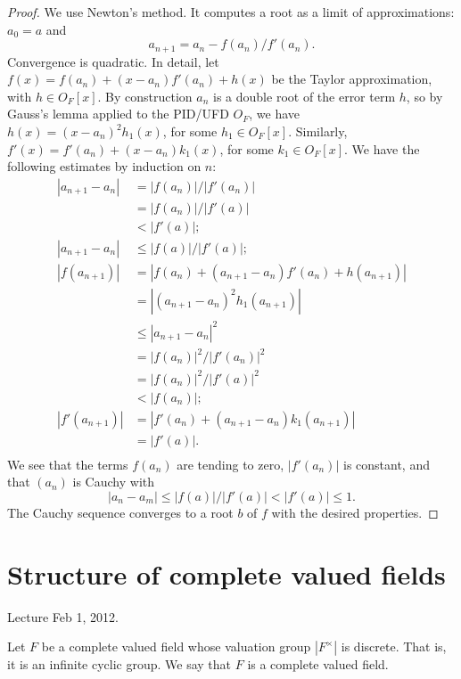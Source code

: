 \documentclass{amsart}
\def\abs#1{{|#1|}}
\begin{document}
\begin{proof} We use Newton's method.  It computes a root as a limit
of approximations:  $a_0=a$ and
\[
 a_{n+1} = a_n - f(a_n)/f'(a_n).
\]
Convergence is quadratic.  In detail, let $f(x) = f(a_n) + (x-a_n)
f'(a_n) + h(x)$ be the Taylor approximation, with $h\in O_F[x]$.  By
construction $a_n$ is a double root of the error term $h$, 
so by Gauss's lemma \cite[8.18]{knapp-basic}
applied to the PID/UFD $O_F$, we have $h(x) = (x-a_n)^2 h_1(x)$, for
some $h_1\in O_F[x]$. Similarly, $f'(x)=f'(a_n)+(x-a_n)k_1(x)$, for some $k_1\in O_F[x]$.
We have the following estimates by induction on $n$:
\begin{align*}
\abs{a_{n+1}-a_n} &= \abs{f(a_n)}/\abs{f'(a_{n})} \\
   &= \abs{f(a_n)}/\abs{f'(a)}\\
   &< \abs{f'(a)};\\
\abs{a_{n+1}-a_n} &\le \abs{f(a)}/\abs{f'(a)};\\
\abs{f(a_{n+1})} &= \abs{f(a_n) +(a_{n+1}-a_n) f'(a_n) + h(a_{n+1})}\\
 &= \abs{(a_{n+1}-a_n)^2h_1(a_{n+1})}\\
 &\le \abs{a_{n+1}-a_n}^2\\
 &= \abs{f(a_n)}^2/\abs{f'(a_{n})}^2\\
 &= \abs{f(a_n)}^2/\abs{f'(a)}^2\\
 &< \abs{f(a_n)};\\
\abs{f'(a_{n+1})} &= \abs{f'(a_{n}) + (a_{n+1}-a_n) k_1(a_{n+1})} \\
  &=\abs{f'(a)}.\\
\end{align*}
We see that the terms $f(a_n)$ are tending to zero, $\abs{f'(a_n)}$ is
constant, and that $(a_n)$ is Cauchy with 
\[
\abs{a_n-a_m}\le
\abs{f(a)}/\abs{f'(a)}< \abs{f'(a)}\le 1.
\]  The Cauchy sequence converges to a root $b$ of $f$ with the desired properties.
\end{proof}


\newpage
\section{Structure of complete valued fields}

Lecture Feb 1, 2012.


Let $F$ be a complete valued field whose valuation group $\abs{F^\times}$ is discrete.
That is, it is an infinite cyclic group.
We say that $F$ is a complete  valued field.
\end{document}
